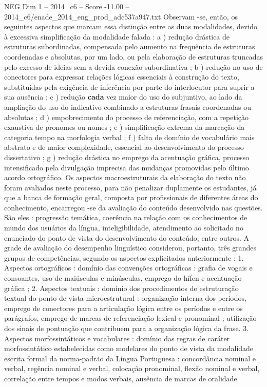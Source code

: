 \begin{textsample}{NEG Dim 1 – 2014\_c6 – Score -11.00 – 2014\_c6/enade\_2014\_eng\_prod\_adc537a947.txt}
Observam -se, então, os seguintes aspectos que marcam essa distinção entre as duas modalidades, devido à excessiva simplificação da modalidade falada : a ) redução drástica de estruturas subordinadas, compensada pelo aumento na frequência de estruturas coordenadas e absolutas, por um lado, ou pela elaboração de estruturas truncadas pelo excesso de ideias sem a devida conexão subordinativa ; b ) redução no uso de conectores para expressar relações lógicas essenciais à construção do texto, substituídas pela exigência de inferência por parte do interlocutor para suprir a sua ausência ; c ) redução \textbf{cada} vez maior do uso do subjuntivo, ao lado da ampliação do uso do indicativo combinado a estruturas frasais coordenadas ou absolutas ; d ) empobrecimento do processo de referenciação, com a repetição exaustiva de pronomes ou nomes ; e ) simplificação extrema da marcação da categoria tempo na morfologia verbal ; f ) falta de domínio de vocabulário mais abstrato e de maior complexidade, essencial ao desenvolvimento do processo dissertativo ; g ) redução drástica no emprego da acentuação gráfica, processo intensificado pela divulgação imprecisa das mudanças promovidas pelo último acordo ortográfico.
Os aspectos macroestruturais da elaboração do texto não foram avaliados neste processo, para não penalizar duplamente os estudantes, já que a banca de formação geral, composta por profissionais de diferentes áreas do conhecimento, encarregou -se da avaliação do conteúdo desenvolvido nas questões.
São eles : progressão temática, coerência na relação com os conhecimentos de mundo dos usuários da língua, inteligibilidade, atendimento ao solicitado no enunciado do ponto de vista do desenvolvimento do conteúdo, entre outros.
A grade de avaliação do desempenho linguístico considerou, portanto, três grandes grupos de competências, segundo os aspectos explicitados anteriormente : 1.
Aspectos ortográficos : domínio das convenções ortográficas : grafia de vogais e consoantes, uso de maiúsculas e minúsculas, emprego do hífen e acentuação gráfica ; 2.
Aspectos textuais : domínio dos procedimentos de estruturação textual do ponto de vista microestrutural : organização interna dos períodos, emprego de conectores para a articulação lógica entre os períodos e entre os parágrafos, emprego de marcas de referenciação lexical e pronominal ; utilização dos sinais de pontuação que contribuem para a organização lógica da frase. 3.
Aspectos morfossintáticos e vocabulares : domínio das regras de caráter morfossintático estabelecidas como modelares do ponto de vista da modalidade escrita formal da norma-padrão da Língua Portuguesa : concordância nominal e verbal, regência nominal e verbal, colocação pronominal, flexão nominal e verbal, correlação entre tempos e modos verbais, ausência de marcas de oralidade.

\end{textsample}

